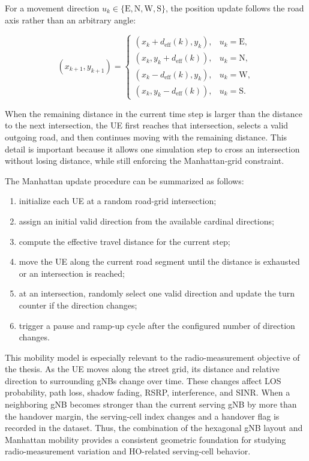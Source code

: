 For a movement direction \(u_k\in\{\mathrm{E},\mathrm{N},\mathrm{W},\mathrm{S}\}\), the position update follows the road axis rather than an arbitrary angle:

\begin{equation}
    (x_{k+1},y_{k+1}) =
    \begin{cases}
    (x_k+d_{\mathrm{eff}}(k),y_k), & u_k=\mathrm{E},\\
    (x_k,y_k+d_{\mathrm{eff}}(k)), & u_k=\mathrm{N},\\
    (x_k-d_{\mathrm{eff}}(k),y_k), & u_k=\mathrm{W},\\
    (x_k,y_k-d_{\mathrm{eff}}(k)), & u_k=\mathrm{S}.
    \end{cases}
\end{equation}

When the remaining distance in the current time step is larger than the distance to the next intersection, the UE first reaches that intersection, selects a valid outgoing road, and then continues moving with the remaining distance. This detail is important because it allows one simulation step to cross an intersection without losing distance, while still enforcing the Manhattan-grid constraint.

The Manhattan update procedure can be summarized as follows:

\begin{enumerate}
    \item initialize each UE at a random road-grid intersection;
    \item assign an initial valid direction from the available cardinal directions;
    \item compute the effective travel distance for the current step;
    \item move the UE along the current road segment until the distance is exhausted or an intersection is reached;
    \item at an intersection, randomly select one valid direction and update the turn counter if the direction changes;
    \item trigger a pause and ramp-up cycle after the configured number of direction changes.
\end{enumerate}

This mobility model is especially relevant to the radio-measurement objective of the thesis. As the UE moves along the street grid, its distance and relative direction to surrounding gNBs change over time. These changes affect LOS probability, path loss, shadow fading, RSRP, interference, and SINR. When a neighboring gNB becomes stronger than the current serving gNB by more than the handover margin, the serving-cell index changes and a handover flag is recorded in the dataset. Thus, the combination of the hexagonal gNB layout and Manhattan mobility provides a consistent geometric foundation for studying radio-measurement variation and HO-related serving-cell behavior.

